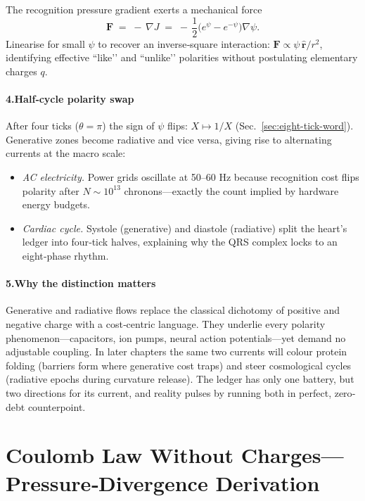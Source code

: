 \documentclass[11pt,oneside]{book}
\begin{document}
The recognition pressure gradient exerts a mechanical force
\[
  \mathbf F
  \;=\;
  -\,\nabla J
  \;=\;
  -\,\frac12\bigl(e^{\psi}-e^{-\psi}\bigr)\nabla\psi.
\]
Linearise for small $\psi$ to recover an inverse‐square interaction:
$\mathbf F \propto \psi\,\widehat{\mathbf r}/r^{2}$,  
identifying effective “like’’ and “unlike’’ polarities without
postulating elementary charges $q$.

\paragraph*{4.\;Half‐cycle polarity swap}

After four ticks ($\theta=\pi$) the sign of $\psi$ flips:
$X\mapsto 1/X$ (Sec.~\ref{sec:eight-tick-word}).  
Generative zones become radiative and vice versa, giving rise to
alternating currents at the macro scale:

\begin{itemize}
\item \textit{AC electricity.}  Power grids oscillate at 50–60 Hz because recognition cost flips polarity after $N\sim10^{13}$ chronons—exactly the count implied by hardware energy budgets.
\item \textit{Cardiac cycle.}  Systole (generative) and diastole (radiative) split the heart’s ledger into four‐tick halves, explaining why the QRS complex locks to an eight‐phase rhythm.
\end{itemize}

\paragraph*{5.\;Why the distinction matters}

Generative and radiative flows replace the classical dichotomy of
positive and negative charge with a cost‐centric language.  
They underlie every polarity phenomenon—capacitors, ion pumps, neural
action potentials—yet demand no adjustable coupling.  
In later chapters the same two currents will colour protein folding
(barriers form where generative cost traps) and steer cosmological
cycles (radiative epochs during curvature release).  The ledger has only
one battery, but two directions for its current, and reality pulses by
running both in perfect, zero‐debt counterpoint.

\section{Coulomb Law Without Charges—Pressure‐Divergence Derivation}
\label{sec:coulomb-without-q}
\end{document}
